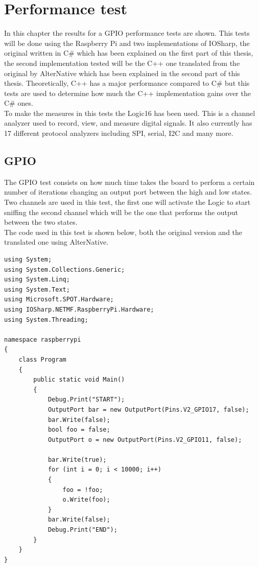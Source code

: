 \chapter{Performance test}\label{S:Performance-Test}
In this chapter the results for a GPIO performance tests are shown. This tests will be done using the Raspberry Pi and two implementations of IOSharp, the original written in C\# which has been explained on the first part of this thesis, the second implementation tested will be the C++ one translated from the original by AlterNative which has been explained in the second part of this thesis. Theoretically, C++ has a major performance compared to C\# but this tests are used to determine how much the C++ implementation gains over the C\# ones.
\\
To make the measures in this tests the Logic16 has been used. This is a channel analyzer used to record, view, and measure digital signals. It also currently has 17 different protocol analyzers including SPI, serial, I2C and many more.

\section{GPIO}\label{SS:IOEx-GPIO}
The GPIO test consists on how much time takes the board to perform a certain number of iterations changing an output port between the high and low states. Two channels are used in this test, the first one will activate the Logic to start sniffing the second channel which will be the one that performs the output between the two states.
\\
The code used in this test is shown below, both the original version and the translated one using AlterNative.
\begin{lstlisting}[language=CSharp, caption={GPIO Performance test in C\#}]
using System;
using System.Collections.Generic;
using System.Linq;
using System.Text;
using Microsoft.SPOT.Hardware;
using IOSharp.NETMF.RaspberryPi.Hardware;
using System.Threading;

namespace raspberrypi
{
    class Program
    {
        public static void Main()
        {
            Debug.Print("START");
            OutputPort bar = new OutputPort(Pins.V2_GPIO17, false);
            bar.Write(false);
            bool foo = false;
            OutputPort o = new OutputPort(Pins.V2_GPIO11, false);

            bar.Write(true);
            for (int i = 0; i < 10000; i++)
            {
                foo = !foo;
                o.Write(foo);
            }
            bar.Write(false);
            Debug.Print("END");
        }
    }
}
\end{lstlisting}

